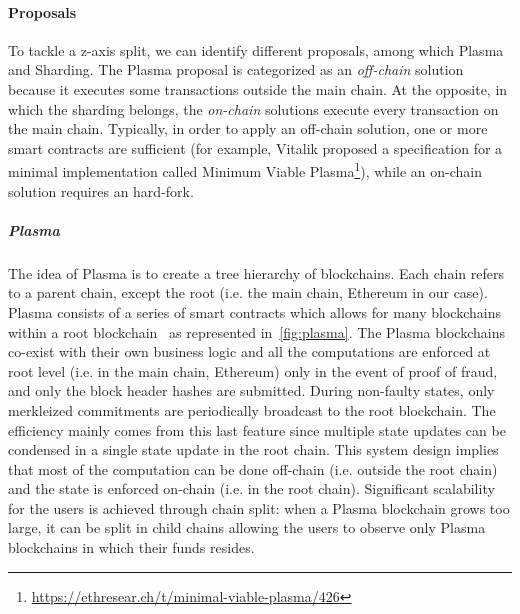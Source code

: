 \paragraph{Proposals} To tackle a z-axis split, we can identify different
proposals, among which Plasma and Sharding. The Plasma proposal is
categorized as an \emph{off-chain} solution because it executes some
transactions outside the main chain. At the opposite, in which the sharding
belongs, the \emph{on-chain} solutions execute every transaction on the main
chain. Typically, in order to apply an off-chain solution, one or more smart
contracts are sufficient (for example, Vitalik proposed a specification for a
minimal implementation called Minimum Viable
Plasma\footnote{\url{https://ethresear.ch/t/minimal-viable-plasma/426}}), while
an on-chain solution requires an hard-fork.

\subparagraph{Plasma}
The idea of Plasma is to create a tree hierarchy of blockchains. Each chain
refers to a parent chain, except the root (i.e. the main chain, Ethereum in our
case). Plasma consists of a series of smart contracts which allows for many
blockchains within a root blockchain~\cite{poon2017plasma} as represented
in~\autoref{fig:plasma}. The Plasma blockchains co-exist with their own business
logic and all the computations are enforced at root level (i.e. in the main
chain, Ethereum) only in the event of proof of fraud, and only the block header
hashes are submitted. During non-faulty states, only merkleized commitments are
periodically broadcast to the root blockchain. The efficiency mainly comes from
this last feature since multiple state updates can be condensed in a single
state update in the root chain. This system design implies that most of the
computation can be done off-chain (i.e. outside the root chain) and the state is
enforced on-chain (i.e. in the root chain). Significant scalability for the
users is achieved through chain split: when a Plasma blockchain grows too large,
it can be split in child chains allowing the users to observe only Plasma
blockchains in which their funds resides.

